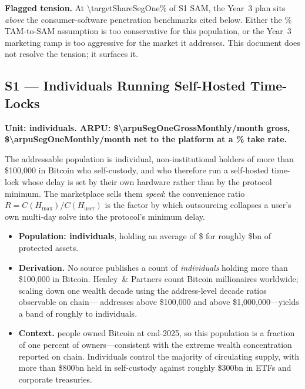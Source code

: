 \noindent\textbf{Flagged tension.} At \num[round-precision=1]{\targetShareSegOne}\% of
S1 SAM, the Year~3 plan sits \emph{above} the consumer-software penetration benchmarks
cited below. Either the \numint{\samPercentSegOne}\% TAM-to-SAM assumption is too
conservative for this population, or the Year~3 marketing ramp is too aggressive for
the market it addresses. This document does not resolve the tension; it surfaces it.

\subsection{S1 --- Individuals Running Self-Hosted Time-Locks}

\textbf{Unit: individuals. ARPU: \$\num{\arpuSegOneGrossMonthly}/month gross,
\$\num{\arpuSegOneMonthly}/month net to the platform at a
\numint{\markPlatformFeePercent}\% take rate.}

The addressable population is individual, non-institutional holders of more than
\$100{,}000 in Bitcoin who self-custody, and who therefore run a self-hosted time-lock
whose delay is set by their own hardware rather than by the protocol minimum. The
marketplace sells them \emph{speed}: the convenience ratio
$R = C(H_{\max})/C(H_{\text{user}})$ is the factor by which outsourcing collapses a
user's own multi-day solve into the protocol's minimum delay.

\begin{itemize}[nosep]
  \item \textbf{Population: \numint{\tamSegOneIndividuals} individuals}, holding an
    average of \$\numint{\tamSegOneAvgHoldingUsd} for roughly
    \$\numint{\tamSegOneAumBn}bn of protected assets.
  \item \textbf{Derivation.} No source publishes a count of \emph{individuals}
    holding more than \$100{,}000 in Bitcoin. Henley~\& Partners count
     Bitcoin millionaires worldwide\cite{henley2025crypto}; scaling
    down one wealth decade using the address-level decade ratios observable on
    chain--- addresses above \$100{,}000 and  above
    \$1{,}000{,}000\cite{bitinfocharts2026}---yields a band of roughly
     to  individuals.
  \item \textbf{Context.}  people owned Bitcoin at
    end-2025\cite{cryptocom2026owners}, so this population is a fraction of one
    percent of owners---consistent with the extreme wealth concentration reported
    on chain\cite{chainalysis2024,triple2023}. Individuals control the majority of
    circulating supply, with more than \$800bn held in self-custody against roughly
    \$300bn in ETFs and corporate treasuries\cite{river2025custody}.
\end{itemize}


